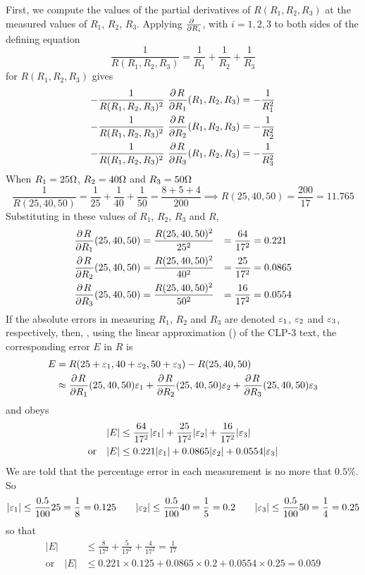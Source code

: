 \begin{solution}
First, we compute the values of the partial derivatives of
$R(R_1,R_2,R_3)$ at the measured values of $R_1$, $R_2$, $R_3$. Applying
$\pdiff{}{R_i}$, with $i=1,2,3$ to both sides of
the defining equation 
\begin{equation*}
\frac{1}{R(R_1,R_2,R_3)}=\frac{1}{R_1}+\frac{1}{R_2}+\frac{1}{R_3}
\end{equation*}
for $R(R_1,R_2,R_3)$ gives
\begin{align*}
-\frac{1}{R(R_1,R_2,R_3)^2}\ \pdiff{R}{R_1}(R_1,R_2,R_3)
&=-\frac{1}{R_1^2}\\
-\frac{1}{R(R_1,R_2,R_3)^2}\ \pdiff{R}{R_2}(R_1,R_2,R_3)
&=-\frac{1}{R_2^2}\\
-\frac{1}{R(R_1,R_2,R_3)^2}\ \pdiff{R}{R_3}(R_1,R_2,R_3)
&=-\frac{1}{R_3^2}
\end{align*}
When $R_1=25\Omega$, $R_2=40\Omega$ and $R_3=50\Omega$
\begin{equation*}
\frac{1}{R(25,40,50)}=\frac{1}{25}+\frac{1}{40}+\frac{1}{50}
=\frac{8+5+4}{200}\implies
R(25,40,50)=\frac{200}{17}=11.765
\end{equation*}
Substituting in these values of $R_1$, $R_2$, $R_3$ and $R$,
\begin{alignat*}{5}
\pdiff{R}{R_1}(25,40,50)
&=\frac{R(25,40,50)^2}{25^2}&=\frac{64}{17^2}&=0.221\\
\pdiff{R}{R_2}(25,40,50)
&=\frac{R(25,40,50)^2}{40^2}&=\frac{25}{17^2}&=0.0865\\
\pdiff{R}{R_3}(25,40,50)
&=\frac{R(25,40,50)^2}{50^2}&=\frac{16}{17^2}&=0.0554
\end{alignat*}
If the absolute errors in measuring $R_1$, $R_2$ and $R_3$ are denoted 
$\varepsilon_1$, $\varepsilon_2$ and $\varepsilon_3$, respectively, then,
, using the linear approximation () 
of the CLP-3 text, the corresponding error $E$ in $R$ is
\begin{align*}
E &= R(25+\veps_1,40+\veps_2,50+\veps_3)-R(25,40,50) \\
&\approx \pdiff{R}{R_1}(25,40,50)\veps_1
       +\pdiff{R}{R_2}(25,40,50)\veps_2
       +\pdiff{R}{R_3}(25,40,50)\veps_3
\end{align*}
and obeys
\begin{align*}
|E|&\le \frac{64}{17^2}|\varepsilon_1|+\frac{25}{17^2}|\varepsilon_2|
                +\frac{16}{17^2}|\varepsilon_3| \\
\text{or}\quad|E|&\le 0.221|\varepsilon_1|+0.0865|\varepsilon_2|+0.0554|\varepsilon_3|
\end{align*}
We are told that the percentage error in each measurement is no more that
$0.5\%$. So
\begin{equation*}
|\varepsilon_1|\le \frac{0.5}{100}25=\frac{1}{8}=0.125\qquad
|\varepsilon_2|\le \frac{0.5}{100}40=\frac{1}{5}=0.2\qquad
|\varepsilon_3|\le \frac{0.5}{100}50=\frac{1}{4}=0.25
\end{equation*}
so that
\begin{align*}
|E|&\le \frac{8}{17^2}+\frac{5}{17^2}+\frac{4}{17^2}
=\frac{1}{17}\\
\text{or}\quad|E|&\le 0.221\times0.125+0.0865\times0.2+0.0554\times0.25
=0.059
\end{align*}
\end{solution}

